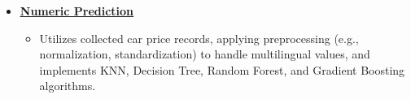 \documentclass[letter,10pt]{article}
\newcommand{\customsquare}{\raisebox{0.25ex}{\scalebox{0.45}{$\blacksquare$}}}
\begin{document}
\begin{itemize}[label={\customsquare}]
    \item \href{https://github.com/karami-mehdi/TodayILearned/tree/main/DataMining}{\underline{\textbf{Numeric Prediction}}}
    \begin{itemize}
        \item Utilizes collected car price records, applying preprocessing (e.g., normalization, standardization) to handle multilingual values, and implements KNN, Decision Tree, Random Forest, and Gradient Boosting algorithms.
    \end{itemize}




\end{itemize}
\end{document}
